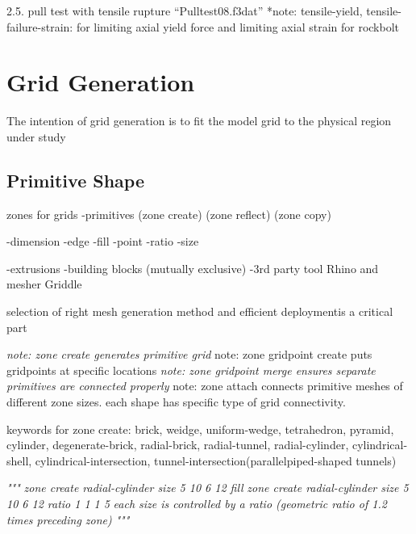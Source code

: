 \documentclass[a4paper, nobind]{templates/ociamthesis}
\newenvironment{Shaded}{\begin{snugshade}}{\end{snugshade}}
\newcommand{\CommentTok}[1]{\textcolor[rgb]{0.56,0.35,0.01}{\textit{#1}}}
\renewenvironment{Shaded}
{
  \vspace{10pt}%
  \begin{snugshade}%
}{%
  \end{snugshade}%
  \vspace{8pt}%
}
\begin{document}
2.5. pull test with tensile rupture ``Pulltest08.f3dat''
*note: tensile-yield, tensile-failure-strain: for limiting axial yield force and limiting axial strain for rockbolt

\newpage

\hypertarget{grid-generation}{%
\chapter{Grid Generation}\label{grid-generation}}

The intention of grid generation is to fit the model grid to the physical region under study

\hypertarget{primitive-shape}{%
\section{Primitive Shape}\label{primitive-shape}}

zones for grids
-primitives (zone create) (zone reflect) (zone copy)

-dimension
-edge
-fill
-point
-ratio
-size

-extrusions
-building blocks
(mutually exclusive)
-3rd party tool Rhino and mesher Griddle

selection of right mesh generation method
and efficient deploymentis a critical part

\emph{note: zone create generates primitive grid
}note: zone gridpoint create puts gridpoints at specific locations
\emph{note: zone gridpoint merge ensures separate primitives are connected properly
}note: zone attach connects primitive meshes of different zone sizes.
each shape has specific type of grid connectivity.

keywords for zone create:
brick, weidge, uniform-wedge, tetrahedron, pyramid, cylinder, degenerate-brick, radial-brick, radial-tunnel, radial-cylinder, cylindrical-shell, cylindrical-intersection, tunnel-intersection(parallelpiped-shaped tunnels)

\begin{Shaded}
\begin{Highlighting}[]
\CommentTok{"""}
\CommentTok{zone create radial{-}cylinder size 5 10 6 12 fill}
\CommentTok{zone create radial{-}cylinder size 5 10 6 12 ratio 1 1 1 5}
\CommentTok{each size is controlled by a ratio (geometric ratio of 1.2 times preceding zone)}
\CommentTok{"""}
\end{Highlighting}
\end{Shaded}
\end{document}
